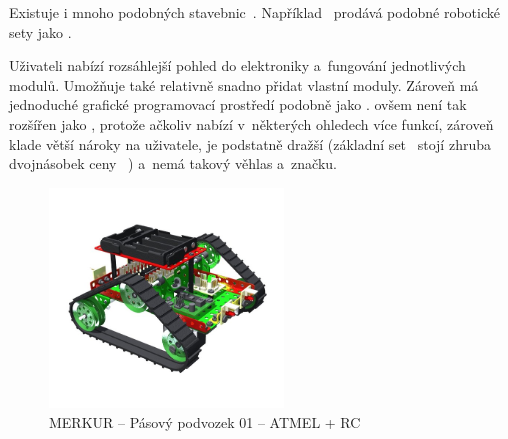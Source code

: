 
Existuje i mnoho podobných stavebnic~\cite{intorobotics_BestAlternativesToLegoMindstormsKits}. 
Například \fischerT ~prodává podobné robotické sety jako \lego{~}\cite{fischertechnik_ROBOTICS}. 

Uživateli nabízí rozsáhlejší pohled do elektroniky a~fungování jednotlivých modulů. 
Umožňuje také relativně snadno přidat vlastní moduly.
Zároveň má jednoduché grafické programovací prostředí podobně jako \lego. 
\FischerT{ }ovšem není tak rozšířen jako \legoM, protože ačkoliv nabízí v~některých ohledech více funkcí, zároveň klade větší nároky na uživatele, je podstatně dražší (základní set~\cite{fischertechnik_HelagoEshop_ROBOTICS-TXT-COMPETITION-SET} stojí zhruba dvojnásobek ceny ~\cite{lego_eduxeEshop_CoreSet}) a~nemá takový věhlas a~značku.



\begin{figure}[h]
	\centering
	\includegraphics[width=235px]{images/MERKUR_Pasovy-podvozek-01_ATMEL+RC.jpg}
	\caption[MERKUR -- Pásový podvozek 01 -- ATMEL + RC]{MERKUR -- Pásový podvozek 01 -- ATMEL + RC\protect\footnotemark}
	\label{fig:MERKUR_Pasovy-podvozek-01_ATMEL+RC}
\end{figure}

